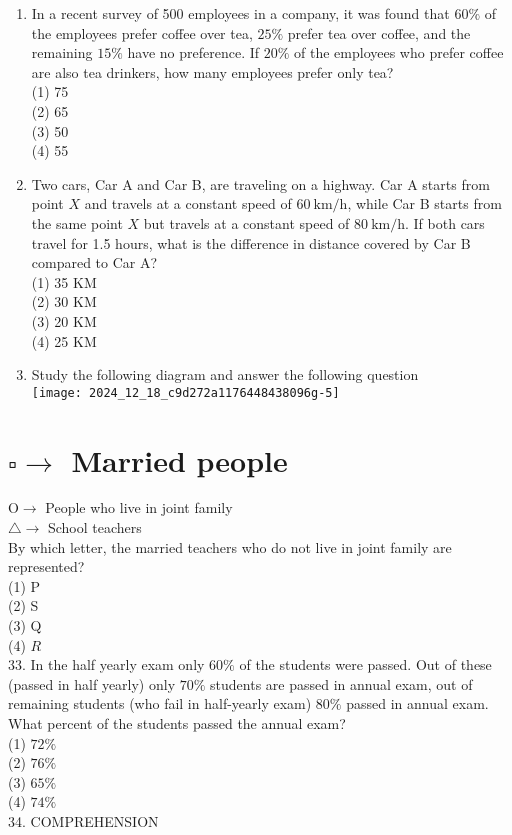 \documentclass[10pt]{article}
\begin{document}
\begin{enumerate}
(1) CDF\\
(2) BCA\\
(3) ABC\\
(4) DEF
  \item In a recent survey of 500 employees in a company, it was found that $60 \%$ of the employees prefer coffee over tea, $25 \%$ prefer tea over coffee, and the remaining $15 \%$ have no preference. If $20 \%$ of the employees who prefer coffee are also tea drinkers, how many employees prefer only tea?\\
(1) 75\\
(2) 65\\
(3) 50\\
(4) 55\\
  \item Two cars, Car A and Car B, are traveling on a highway. Car A starts from point $X$ and travels at a constant speed of $60 \mathrm{~km} / \mathrm{h}$, while Car B starts from the same point $X$ but travels at a constant speed of $80 \mathrm{~km} / \mathrm{h}$. If both cars travel for 1.5 hours, what is the difference in distance covered by Car B compared to Car A?\\
(1) 35 KM\\
(2) 30 KM\\
(3) 20 KM\\
(4) 25 KM\\

  \item Study the following diagram and answer the following question\\
\texttt{[image: 2024\_12\_18\_c9d272a1176448438096g-5]}
\end{enumerate}

\section*{$\square \rightarrow$ Married people}
$\mathrm{O} \rightarrow$ People who live in joint family\\
$\triangle \rightarrow$ School teachers\\
By which letter, the married teachers who do not live in joint family are represented?\\
(1) P\\
(2) S\\
(3) Q\\
(4) $R$\\
33. In the half yearly exam only $60 \%$ of the students were passed. Out of these (passed in half yearly) only $70 \%$ students are passed in annual exam, out of remaining students (who fail in half-yearly exam) $80 \%$ passed in annual exam. What percent of the students passed the annual exam?\\
(1) $72 \%$\\
(2) $76 \%$\\
(3) $65 \%$\\
(4) $74 \%$\\
34. COMPREHENSION
\end{document}
